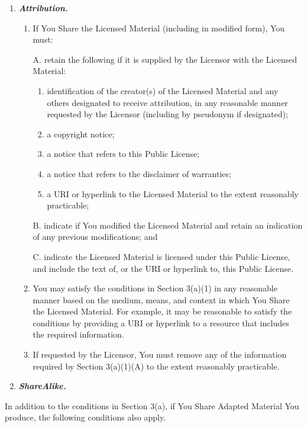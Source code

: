 \documentclass[]{book}
\begin{document}
\begin{enumerate}
\def\labelenumi{\alph{enumi}.}
\item
  \textbf{\emph{Attribution.}}

  \begin{enumerate}
  \def\labelenumii{\arabic{enumii}.}
  \item
    If You Share the Licensed Material (including in modified form), You must:

    A. retain the following if it is supplied by the Licensor with the Licensed Material:

    \begin{enumerate}
    \def\labelenumiii{\roman{enumiii}.}
    \item
      identification of the creator(s) of the Licensed Material and any others designated to receive attribution, in any reasonable manner requested by the Licensor (including by pseudonym if designated);
    \item
      a copyright notice;
    \item
      a notice that refers to this Public License;
    \item
      a notice that refers to the disclaimer of warranties;
    \item
      a URI or hyperlink to the Licensed Material to the extent reasonably practicable;
    \end{enumerate}

    B. indicate if You modified the Licensed Material and retain an indication of any previous modifications; and

    C. indicate the Licensed Material is licensed under this Public License, and include the text of, or the URI or hyperlink to, this Public License.
  \item
    You may satisfy the conditions in Section 3(a)(1) in any reasonable manner based on the medium, means, and context in which You Share the Licensed Material. For example, it may be reasonable to satisfy the conditions by providing a URI or hyperlink to a resource that includes the required information.
  \item
    If requested by the Licensor, You must remove any of the information required by Section 3(a)(1)(A) to the extent reasonably practicable.
  \end{enumerate}
\item
  \textbf{\emph{ShareAlike.}}
\end{enumerate}

In addition to the conditions in Section 3(a), if You Share Adapted Material You produce, the following conditions also apply.
\end{document}
